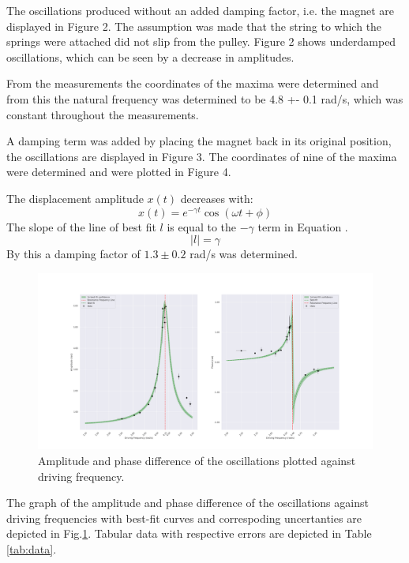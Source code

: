The oscillations produced without an added damping factor, i.e. the magnet are displayed in Figure 2. The assumption was made that the string to which the springs were attached did not slip from the pulley. Figure 2 shows underdamped oscillations, which can be seen by a decrease in amplitudes.


From the measurements the coordinates of the maxima were determined and from this the natural frequency was determined to be 4.8 +- 0.1 rad/s, which was constant throughout the measurements.

A damping term was added by placing the magnet back in its original position, the oscillations are displayed in Figure 3. The coordinates of nine of the maxima were determined and were plotted in Figure 4. 


The displacement amplitude $x(t)$ decreases with:
\begin{equation}
  x(t) = e^{-\gamma t} \cos(\omega t + \phi) 
\end{equation}
The slope of the line of best fit $l$ is equal to the $-\gamma$ term in Equation .
\begin{equation}
  |l| = \gamma 
\end{equation}
By this a damping factor of $1.3 ± 0.2$ rad/s was determined.



\begin{figure}[H]
  \centering
  \includegraphics[width=1\textwidth]{oscillations/images/resonance}
  \caption{Amplitude and phase difference of the oscillations plotted against driving frequency.}
  \label{fig:resonance}
\end{figure}

The graph of the amplitude and phase difference of the oscillations against driving frequencies with best-fit curves and correspoding uncertanties are depicted in Fig.\ref{fig:resonance}. Tabular data with respective errors are depicted in Table \ref{tab:data}.

